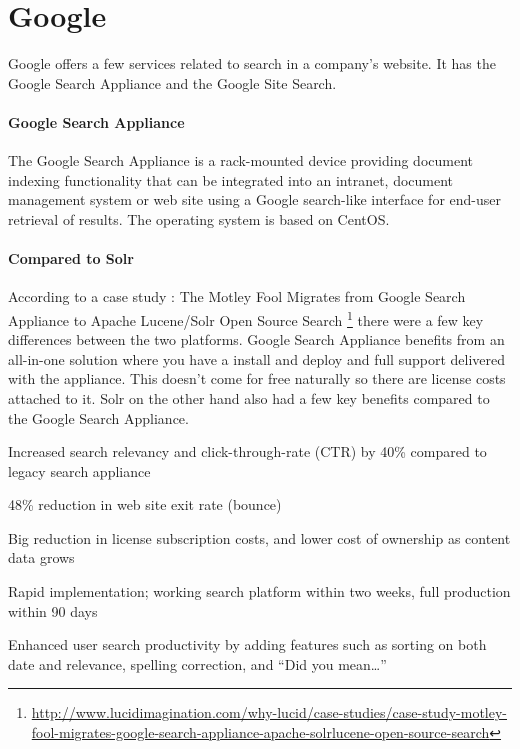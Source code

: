 \section{Google}
Google offers a few services related to search in a company's website. It has the Google Search Appliance and the Google Site Search.

\paragraph{Google Search Appliance} The Google Search Appliance is a rack-mounted device providing document indexing functionality that can be integrated into an intranet, document management system or web site using a Google search-like interface for end-user retrieval of results. The operating system is based on CentOS. 

\paragraph{Compared to Solr} According to a case study : The Motley Fool Migrates from Google Search Appliance to Apache Lucene/Solr Open Source Search \footnote{\url{http://www.lucidimagination.com/why-lucid/case-studies/case-study-motley-fool-migrates-google-search-appliance-apache-solrlucene-open-source-search}} there were a few key differences between the two platforms. Google Search Appliance benefits from an all-in-one solution where you have a install and deploy and full support delivered with the appliance. This doesn't come for free naturally so there are license costs attached to it. Solr on the other hand also had a few key benefits compared to the Google Search Appliance. 

\begin{packed_itemize}
\item Increased search relevancy and click-through-rate (CTR) by 40\% compared to legacy search appliance
\item 48\% reduction in web site exit rate (bounce)
\item Big reduction in license subscription costs, and lower cost of ownership as content data grows
\item Rapid implementation; working search platform within two weeks, full production within 90 days
\item Enhanced user search productivity by adding features such as sorting on both date and relevance, spelling correction, and “Did you mean…”
\end{packed_itemize}

